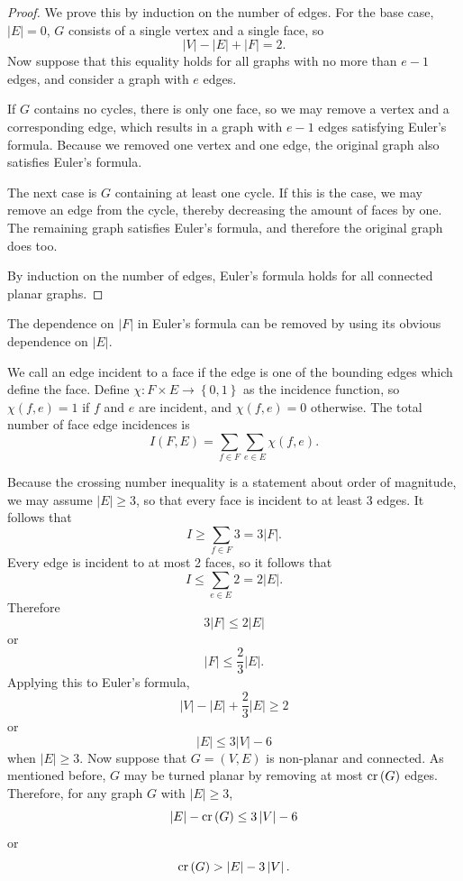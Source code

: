 \documentclass[12pt,reqno]{amsart}
\begin{document}
\begin{proof}
We prove this by induction on the number of edges. For the base case, \(\left\lvert E \right\rvert = 0\),
\(G\) consists of a single vertex and a single face, so
\[
    \left\lvert V \right\rvert - \left\lvert E \right\rvert + \left\lvert F \right\rvert =2
.\]
Now suppose that this equality holds for all graphs with no more than \(e - 1\) edges,
and consider a graph with \(e\) edges. 

If \(G\) contains no cycles, there
is only one face, so we may remove a vertex and a corresponding edge, which results
in a graph with \(e-1\) edges satisfying Euler's formula. Because we removed one
vertex and one edge, the original graph also satisfies Euler's formula.

The next case is \(G\) containing at least one cycle. If this is the case, we
may remove an edge from the cycle, thereby decreasing the amount of faces by one.
The remaining graph satisfies Euler's formula, and therefore the original graph does too.

By induction on the number of edges, Euler's formula holds for all connected planar graphs.
\end{proof}

The dependence on \(\left\lvert F \right\rvert \) in Euler's formula can be removed by using
its obvious dependence on \(\left\lvert E \right\rvert \). 

We call an edge incident to a face if the edge is one of the bounding edges which define the face. 
Define \(\chi : F \times E \to \left\{ 0,1 \right\} \) as the incidence function, so
\(\chi(f,e) = 1\) if \(f\) and \(e\) are incident, and \(\chi(f,e) = 0\) otherwise.
The total number of face edge incidences is
\[
    I(F,E) = \sum_{f\in F} \sum _{e \in E} \chi(f,e)
.\]

Because the crossing number inequality is a statement about order of magnitude,
we may assume \(\left\lvert E \right\rvert  \geq 3\), so that every face is incident to at least 3 edges.
It follows that
\[
    I \geq \sum _{f \in F} 3 = 3 \left\lvert F \right\rvert 
.\]
Every edge is incident to at most 2 faces, so it follows that
\[
    I \leq \sum _{e \in E} 2 = 2 \left\lvert E \right\rvert 
.\]
Therefore
\[
    3 \left\lvert F \right\rvert \leq 2 \left\lvert E \right\rvert 
\]
or
\[
    \left\lvert F \right\rvert \leq \frac{2}{3} \left\lvert E \right\rvert 
.\]
Applying this to Euler's formula,
\[
    \left\lvert V \right\rvert - \left\lvert E \right\rvert + \frac{2}{3} \left\lvert E \right\rvert \geq 2
\]
or
\[
    \left\lvert E \right\rvert \leq 3 \left\lvert V \right\rvert -6
\]
when \(\left\lvert E \right\rvert \geq 3\).
Now suppose that \(G = (V,E)\) is non-planar and connected. As mentioned before, \(G\) may be turned planar by removing
at most \(\operatorname{cr}\left( G \right) \) edges.
Therefore, for any graph \(G\) with \(\left\lvert E \right\rvert  \geq 3\),
\[
    \left\lvert E \right\rvert - \operatorname{cr}\left( G \right) \leq 3 \left\lvert V \right\rvert - 6
\]
or
\[
    \operatorname{cr}\left( G \right) > \left\lvert E \right\rvert - 3 \left\lvert V \right\rvert 
.\]
\end{document}
